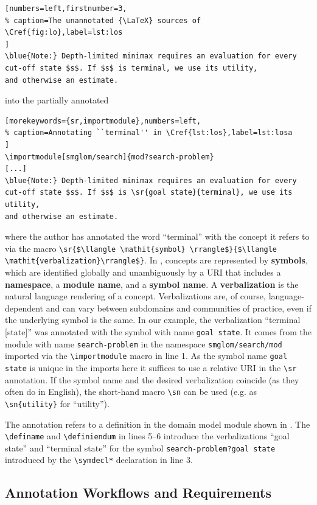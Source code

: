 \documentclass[runningheads]{llncs}
\def\llangle{\langle\kern-.2em\langle}
\def\rrangle{\rangle\kern-.2em\rangle}
\begin{document}
\begin{lstlisting}[numbers=left,firstnumber=3,
% caption=The unannotated {\LaTeX} sources of \Cref{fig:lo},label=lst:los
]
\blue{Note:} Depth-limited minimax requires an evaluation for every
cut-off state $s$. If $s$ is terminal, we use its utility,
and otherwise an estimate.
\end{lstlisting}
into the partially annotated 
\begin{lstlisting}[morekeywords={sr,importmodule},numbers=left,
% caption=Annotating ``terminal'' in \Cref{lst:los},label=lst:losa
]
\importmodule[smglom/search]{mod?search-problem}
[...]
\blue{Note:} Depth-limited minimax requires an evaluation for every
cut-off state $s$. If $s$ is \sr{goal state}{terminal}, we use its utility,
and otherwise an estimate.
\end{lstlisting}
where the author has annotated the word ``terminal'' with the concept it refers to via the
\sTeX macro
\lstinline[mathescape]|\sr{$\llangle \mathit{symbol} \rrangle$}{$\llangle \mathit{verbalization}\rrangle$}|.
In \sTeX, concepts are represented by \textbf{symbols}, which are identified globally and
unambiguously by a URI that includes a \textbf{namespace}, a \textbf{module name}, and a
\textbf{symbol name}.  A \textbf{verbalization} is the natural language rendering of a
concept.  Verbalizations are, of course, language-dependent and can vary between
subdomains and communities of practice, even if the underlying symbol is the same.  In our
example, the verbalization ``terminal [state]'' was annotated with the symbol with name
\lstinline|goal state|. It comes from the module with name \lstinline|search-problem| in
the namespace \lstinline|smglom/search/mod| imported via the \lstinline|\importmodule|
macro in line 1. As the symbol name \lstinline|goal state| is unique in the imports here
it suffices to use a relative URI in the \lstinline|\sr| annotation. If the symbol name
and the desired verbalization coincide (as they often do in English), the short-hand macro
\lstinline|\sn| can be used (e.g. as \lstinline|\sn{utility}| for ``utility'').


The annotation refers to a definition in the domain model module shown in
.  The \lstinline|\definame| and \lstinline|\definiendum| in lines
5--6 introduce the verbalizations ``goal state'' and ``terminal state'' for the symbol
\lstinline|search-problem?goal state| introduced by the \lstinline|\symdecl*| declaration in
line 3.

\subsection{Annotation Workflows and Requirements}\label{sec:workflows}
\end{document}
